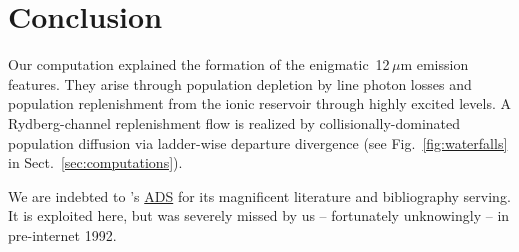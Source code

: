 \documentclass{aa}    %
\def\acp#1{\pdftooltip{\acs{#1}}{\acl{#1}}}
\def\MgI{\ion{Mg}{I}}          %
\begin{document}
\section{Conclusion} \label{sec:conclusion}
Our computation explained the formation of the enigmatic
\MgI\,12\,$\mu$m emission features.
They arise through population depletion by line photon losses and
population replenishment from the ionic reservoir through highly
excited levels.
A Rydberg-channel replenishment flow is realized by
collisionally-dominated population diffusion via ladder-wise departure
divergence (see Fig.~\ref{fig:waterfalls} in
Sect.~\ref{sec:computations}).  

\begin{acknowledgements} 
We are indebted to \acp{NASA}'s \href{http://adsabs.harvard.edu}{ADS}
for its magnificent literature and bibliography serving.
It is exploited here, but was severely missed by us -- fortunately
unknowingly -- in pre-internet 1992.
\end{acknowledgements}

\end{document}
